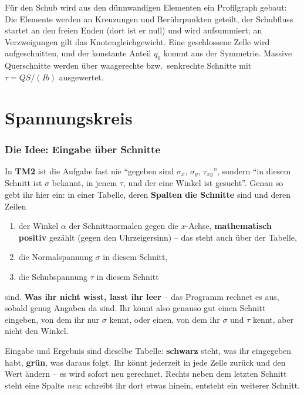 Für den Schub wird aus den dünnwandigen Elementen ein Profilgraph gebaut: Die Elemente werden an
Kreuzungen und Berührpunkten geteilt, der Schubfluss startet an den freien Enden (dort ist er
null) und wird aufsummiert; an Verzweigungen gilt das Knotengleichgewicht. Eine geschlossene
Zelle wird aufgeschnitten, und der konstante Anteil $q_0$ kommt aus der Symmetrie. Massive
Querschnitte werden über waagerechte bzw.\ senkrechte Schnitte mit $\tau = QS/(Ib)$ ausgewertet.

\part{Spannungskreis}

\section{Die Idee: Eingabe über Schnitte}

In \textbf{TM2} ist die Aufgabe fast nie \enquote{gegeben sind $\sigma_x$, $\sigma_y$,
$\tau_{xy}$}, sondern \enquote{in diesem Schnitt ist $\sigma$ bekannt, in jenem $\tau$, und der
eine Winkel ist gesucht}. Genau so gebt ihr hier ein: in einer Tabelle, deren \textbf{Spalten die
Schnitte} sind und deren Zeilen

\begin{enumerate}
  \item der Winkel $\alpha$ der Schnittnormalen gegen die $x$-Achse, \textbf{mathematisch
        positiv} gezählt (gegen den Uhrzeigersinn) -- das steht auch über der Tabelle,
  \item die Normalspannung $\sigma$ in diesem Schnitt,
  \item die Schubspannung $\tau$ in diesem Schnitt
\end{enumerate}

sind. \textbf{Was ihr nicht wisst, lasst ihr leer} -- das Programm rechnet es aus, sobald genug
Angaben da sind. Ihr könnt also genauso gut einen Schnitt eingeben, von dem ihr nur $\sigma$
kennt, oder einen, von dem ihr $\sigma$ und $\tau$ kennt, aber nicht den Winkel.

Eingabe und Ergebnis sind dieselbe Tabelle: \textbf{schwarz} steht, was ihr eingegeben habt,
\textcolor{green!50!black}{\textbf{grün}}, was daraus folgt. Ihr könnt jederzeit in jede Zelle
zurück und den Wert ändern -- es wird sofort neu gerechnet. Rechts neben dem letzten Schnitt
steht eine Spalte \emph{neu}: schreibt ihr dort etwas hinein, entsteht ein weiterer Schnitt.

